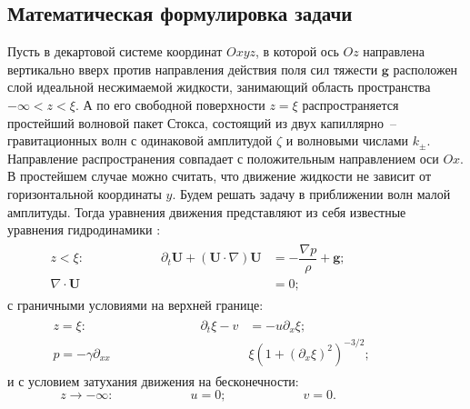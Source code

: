 \subsection{Математическая формулировка задачи}

Пусть в декартовой системе координат $ Oxyz $, в которой ось $ Oz $  направлена вертикально вверх против направления действия поля сил тяжести $ \mathbf{g} $  расположен слой идеальной несжимаемой жидкости, занимающий область пространства  $ -\infty <z<\xi $. А по его свободной поверхности $ z=\xi $  распространяется простейший волновой пакет Стокса, состоящий из двух капиллярно~-- гравитационных волн с одинаковой амплитудой $ \zeta $  и волновыми числами $ k_{\pm} $. Направление распространения совпадает с положительным направлением оси  $ Ox $. В простейшем случае можно считать, что движение жидкости не зависит от горизонтальной координаты  $ y $. Будем решать задачу в приближении волн малой амплитуды. Тогда уравнения движения представляют из себя известные уравнения гидродинамики \parencite{Landau}:
\begin{align}
\begin{aligned}
z<\xi: \mspace{108mu} \partial_{t} \mathbf{U}+\left( \mathbf{U} \cdot  \nabla \right) \mathbf{U} &= - \dfrac{\nabla p}{\rho}+\mathbf{g} ; \mspace{108mu}
\\
 \nabla \cdot \mathbf{U}&=0;\label{EulerPack}
\end{aligned}
\end{align}
с граничными условиями на верхней границе:
\begin{align}
\begin{aligned}
z=\xi: \mspace{160mu} \partial_{t} \xi-v &= - u \partial_{x}\xi ;\mspace{160mu}
\\
 p=-\gamma \partial_{xx}&\xi \left( 1+\left( \partial_{x}\xi \right)^{2}\right)^{-3/2} ;\label{GUPack}
\end{aligned}
\end{align}
и с условием затухания движения на бесконечности:
\begin{equation}
z \rightarrow -\infty: \mspace{108mu} u=0; \mspace{108mu} v=0. \mspace{108mu}
\end{equation}

